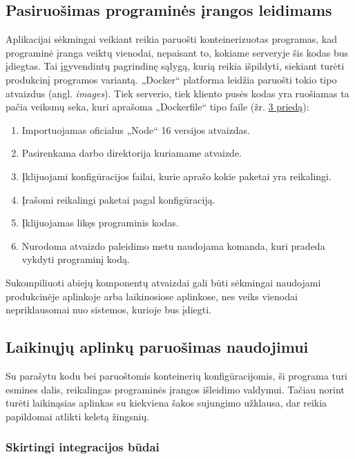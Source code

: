 \documentclass{VUMIFPSkursinis}
\begin{document}
\subsection{Pasiruošimas programinės įrangos leidimams}

Aplikacijai sėkmingai veikiant reikia paruošti konteinerizuotas programas, kad programinė įranga veiktų vienodai, nepaisant to, kokiame serveryje šis kodas bus įdiegtas. Tai įgyvendintų pagrindinę sąlygą, kurią reikia išpildyti, siekiant turėti produkcinį programos variantą. „Docker“ platforma leidžia paruošti tokio tipo atvaizdus (angl. \textit{images}). Tiek serverio, tiek kliento pusės kodas yra ruošiamas ta pačia veiksmų seka, kuri aprašoma „Dockerfile“ tipo faile (žr. \hyperref[priedas3]{3 priedą}):

\begin{enumerate}
  \item Importuojamas oficialus „Node“ 16 versijos atvaizdas.
  \item Pasirenkama darbo direktorija kuriamame atvaizde.
  \item Įklijuojami konfigūracijos failai, kurie aprašo kokie paketai yra reikalingi.
  \item Įrašomi reikalingi paketai pagal konfigūraciją.
  \item Įklijuojamas likęs programinis kodas.
  \item Nurodoma atvaizdo paleidimo metu naudojama komanda, kuri pradeda vykdyti programinį kodą.
\end{enumerate}

Sukompiliuoti abiejų komponentų atvaizdai gali būti sėkmingai naudojami produkcinėje aplinkoje arba laikinosiose aplinkose, nes veiks vienodai nepriklausomai nuo sistemos, kurioje bus įdiegti.

\subsection{Laikinųjų aplinkų paruošimas naudojimui}

Su parašytu kodu bei paruoštomis konteinerių konfigūracijomis, ši programa turi esmines dalis, reikalingas programinės įrangos išleidimo valdymui. Tačiau norint turėti laikinąsias aplinkas su kiekviena šakos sujungimo užklausa, dar reikia papildomai atlikti keletą žingsnių.

    \subsubsection{Skirtingi integracijos būdai}
\end{document}
